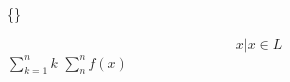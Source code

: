 \documentclass{article}
\begin{document}
\DeclarePairedDelimiter\set\{\}

$${x \vert x} \in L$$
$\sum_ {k=1} ^ {n} k$
$\sum _ {n} ^ {n} f(x)$
\end{document}
